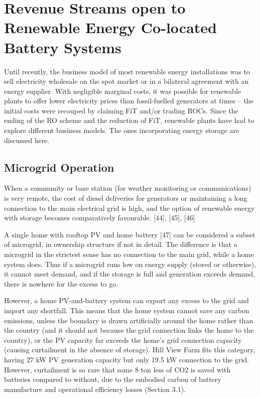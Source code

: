 \documentclass[report_18month.tex]{subfiles}
\begin{document}
\section{Revenue Streams open to Renewable Energy Co-located Battery Systems}
Until recently, the business model of most renewable energy installations was to sell electricity wholesale on the spot market or in a bilateral agreement with an energy supplier. With negligible marginal costs, it was possible for renewable plants to offer lower electricity prices than fossil-fuelled generators at times – the initial costs were recouped by claiming FiT and/or trading ROCs. Since the ending of the RO scheme and the reduction of FiT, renewable plants have had to explore different business models. The ones incorporating energy storage are discussed here.

\subsection{Microgrid Operation}
When a community or base station (for weather monitoring or communications) is very remote, the cost of diesel deliveries for generators or maintaining a long connection to the main electrical grid is high, and the option of renewable energy with storage becomes comparatively favourable. [44], [45], [46]

A single home with rooftop PV and home battery [47] can be considered a subset of microgrid, in ownership structure if not in detail. The difference is that a microgrid in the strictest sense has no connection to the main grid, while a home system does. Thus if a microgrid runs low on energy supply (stored or otherwise), it cannot meet demand, and if the storage is full and generation exceeds demand, there is nowhere for the excess to go.

However, a home PV-and-battery system can export any excess to the grid and import any shortfall. This means that the home system cannot save any carbon emissions, unless the boundary is drawn artificially around the home rather than the country (and it should not because the grid connection links the home to the country), or the PV capacity far exceeds the home’s grid connection capacity (causing curtailment in the absence of storage). Hill View Farm fits this category, having 27 kW PV generation capacity but only 19.5 kW connection to the grid. However, curtailment is so rare that some 8 ton less of CO2 is saved with batteries compared to without, due to the embodied carbon of battery manufacture and operational efficiency losses (Section 3.1).
\end{document}
